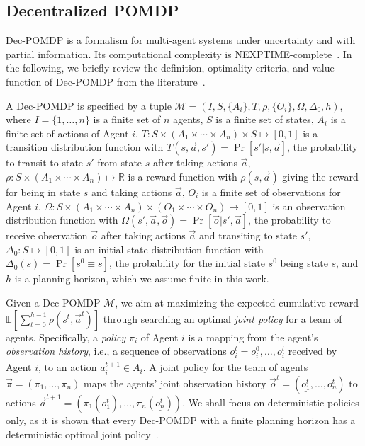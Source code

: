 \subsection{Decentralized POMDP}
\label{sect:dssat-dec-pomdp}
Dec-POMDP is a formalism for multi-agent systems under uncertainty and with partial information.
Its computational complexity is NEXPTIME-complete~\cite{Bernstein2002}.
In the following, we briefly review the definition, optimality criteria,
and value function of Dec-POMDP from the literature~\cite{Oliehoek2016}.

A Dec-POMDP is specified by a tuple $\mathcal{M}=(I,S,\{A_i\},T,\rho,\{O_i\},\Omega,\Delta_0,h)$, where
$I=\{1,\ldots,n\}$ is a finite set of $n$ agents,
$S$ is a finite set of states,
$A_i$ is a finite set of actions of Agent $i$,
$T:S\times(A_1\times\cdots\times A_n)\times S\mapsto [0,1]$ is a transition distribution function with
$T(s,\Vec{a},s')=\Pr[s'|s,\vec{a}]$,
the probability to transit to state $s'$ from state $s$ after taking actions $\vec{a}$,
$\rho:S\times(A_1\times\cdots\times A_n)\mapsto\mathbb{R}$ is a reward function with
$\rho(s,\vec{a})$ giving the reward for being in state $s$ and taking actions $\vec{a}$,
$O_i$ is a finite set of observations for Agent $i$,
$\Omega:S\times(A_1\times\cdots\times A_n)\times(O_1\times\cdots\times O_n)\mapsto[0,1]$ is an observation distribution function with
$\Omega(s',\Vec{a},\vec{o})=\Pr[\vec{o}|s',\vec{a}]$,
the probability to receive observation $\vec{o}$ after taking actions $\vec{a}$ and transiting to state $s'$, $\Delta_0:S\mapsto [0,1]$ is an initial state distribution function with $\Delta_0(s)=\Pr[s^0 \equiv s]$,
the probability for the initial state $s^0$ being state $s$,
and $h$ is a planning horizon, which we assume finite in this work.

Given a Dec-POMDP $\mathcal{M}$,
we aim at maximizing the expected cumulative reward $\mathbb{E}[\sum_{t=0}^{h-1}\rho(s^t,\vec{a}^t)]$ through searching an optimal \textit{joint policy} for a team of agents.
Specifically, a \textit{policy} $\pi_i$ of Agent $i$ is a mapping from the agent's \textit{observation history},
i.e., a sequence of observations $\underline{o_i^t}=o_i^0,\ldots,o_i^t$ received by Agent $i$,
to an action $a_i^{t+1}\in A_i$.
A joint policy for the team of agents $\vec{\pi}=(\pi_1,\ldots,\pi_n)$ maps the agents' joint observation history $\vec{\underline{o}}^t=(\underline{o_1^t},\ldots,\underline{o_n^t})$ to actions $\vec{a}^{t+1}=(\pi_1(\underline{o_1^t}),\ldots,\pi_n(\underline{o_n^t}))$.
We shall focus on deterministic policies only,
as it is shown that every Dec-POMDP with a finite planning horizon has a deterministic optimal joint policy~\cite{Oliehoek2008}.

